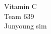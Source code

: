 \documentclass[preview]{standalone}
\begin{document}
Vitamin C\\Team 639\\Junyoung sim\\
\end{document}

